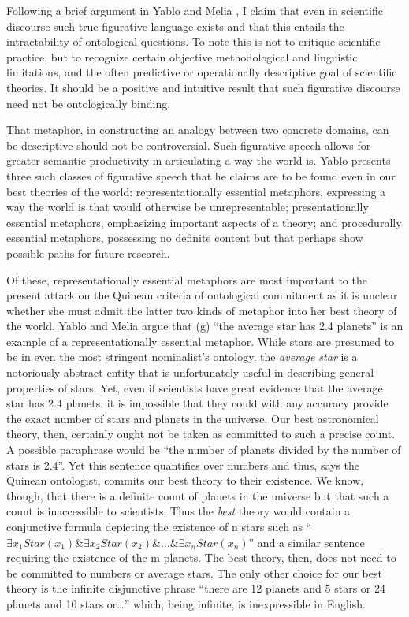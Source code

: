 Following a brief argument in Yablo \cite{yablo} and Melia
\cite{melia}, I claim that even in scientific discourse such true
figurative language exists and that this entails the intractability of
ontological questions. To note this is not to critique scientific
practice, but to recognize certain objective methodological and
linguistic limitations, and the often predictive or operationally
descriptive goal of scientific theories. It should be a positive and
intuitive result that such figurative discourse need not be
ontologically binding.

That metaphor, in constructing an analogy between two concrete
domains, can be descriptive should not be controversial.  Such
figurative speech allows for greater semantic productivity in
articulating a way the world is. Yablo presents three such classes of
figurative speech that he claims are to be found even in our best
theories of the world: representationally essential metaphors,
expressing a way the world is that would otherwise be unrepresentable;
presentationally essential metaphors, emphasizing important aspects of
a theory; and procedurally essential metaphors, possessing no definite
content but that perhaps show possible paths for future research.

Of these, representationally essential metaphors are most important to
the present attack on the Quinean criteria of ontological commitment
as it is unclear whether she must admit the latter two kinds of
metaphor into her best theory of the world.  Yablo and Melia argue
that (g) ``the average star has 2.4 planets'' is an example of a
representationally essential metaphor.  While stars are presumed to be
in even the most stringent nominalist's ontology, the \emph{average
  star} is a notoriously abstract entity that is unfortunately useful
in describing general properties of stars.  Yet, even if scientists
have great evidence that the average star has 2.4 planets, it is
impossible that they could with any accuracy provide the exact number
of stars and planets in the universe. Our best astronomical theory,
then, certainly ought not be taken as committed to such a precise
count. A possible paraphrase would be ``the number of planets divided
by the number of stars is 2.4''.  Yet this sentence quantifies over
numbers and thus, says the Quinean ontologist, commits our best theory
to their existence.  We know, though, that there is a definite count
of planets in the universe but that such a count is inaccessible to
scientists. Thus the \emph{best} theory would contain a conjunctive
formula depicting the existence of n stars such as ``$\exists
x_1Star(x_1) \& \exists x_2Star(x_2) \& \ldots \& \exists
x_nStar(x_n)$'' and a similar sentence requiring the existence of the
m planets. The best theory, then, does not need to be committed to
numbers or average stars.  The only other choice for our best theory
is the infinite disjunctive phrase ``there are 12 planets and 5 stars
or 24 planets and 10 stars or\ldots'' which, being infinite, is
inexpressible in English.  


